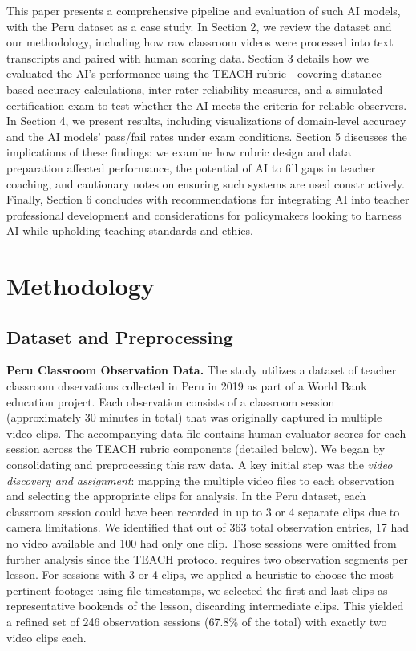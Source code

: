 \documentclass[12pt]{article}
\begin{document}
This paper presents a comprehensive pipeline and evaluation of such AI models, with the Peru dataset as a case study. In Section 2, we review the dataset and our methodology, including how raw classroom videos were processed into text transcripts and paired with human scoring data. Section 3 details how we evaluated the AI’s performance using the TEACH rubric—covering distance-based accuracy calculations, inter-rater reliability measures, and a simulated certification exam to test whether the AI meets the criteria for reliable observers. In Section 4, we present results, including visualizations of domain-level accuracy and the AI models’ pass/fail rates under exam conditions. Section 5 discusses the implications of these findings: we examine how rubric design and data preparation affected performance, the potential of AI to fill gaps in teacher coaching, and cautionary notes on ensuring such systems are used constructively. Finally, Section 6 concludes with recommendations for integrating AI into teacher professional development and considerations for policymakers looking to harness AI while upholding teaching standards and ethics.

\section{Methodology}
\label{sec:methods}
\subsection{Dataset and Preprocessing}
\noindent \textbf{Peru Classroom Observation Data.} The study utilizes a dataset of teacher classroom observations collected in Peru in 2019 as part of a World Bank education project. Each observation consists of a classroom session (approximately 30 minutes in total) that was originally captured in multiple video clips. The accompanying data file contains human evaluator scores for each session across the TEACH rubric components (detailed below). We began by consolidating and preprocessing this raw data. A key initial step was the \textit{video discovery and assignment}: mapping the multiple video files to each observation and selecting the appropriate clips for analysis. In the Peru dataset, each classroom session could have been recorded in up to 3 or 4 separate clips due to camera limitations. We identified that out of 363 total observation entries, 17 had no video available and 100 had only one clip. Those sessions were omitted from further analysis since the TEACH protocol requires two observation segments per lesson. For sessions with 3 or 4 clips, we applied a heuristic to choose the most pertinent footage: using file timestamps, we selected the first and last clips as representative bookends of the lesson, discarding intermediate clips. This yielded a refined set of 246 observation sessions (67.8\% of the total) with exactly two video clips each.
\end{document}
